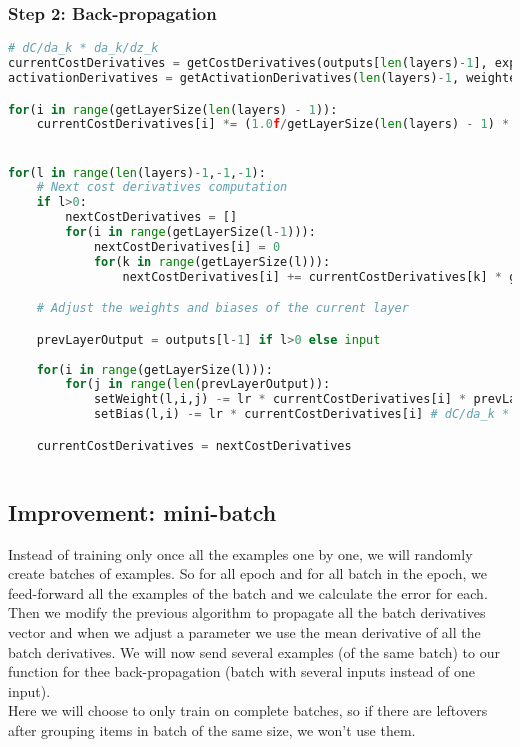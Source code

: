 \documentclass[11pt,a4paper]{report}
\begin{document}
\subsubsection{Step 2: Back-propagation}
\begin{lstlisting}[language=Python]
# dC/da_k * da_k/dz_k
currentCostDerivatives = getCostDerivatives(outputs[len(layers)-1], expectedOutput) # vector of dC/da_k for all k
activationDerivatives = getActivationDerivatives(len(layers)-1, weightedSums[getNbLayers()-1]); # vector of da_k/dz_k for all k

for(i in range(getLayerSize(len(layers) - 1)):
    currentCostDerivatives[i] *= (1.0f/getLayerSize(len(layers) - 1) * activationDerivatives[i];


for(l in range(len(layers)-1,-1,-1):
    # Next cost derivatives computation
    if l>0:
        nextCostDerivatives = []
        for(i in range(getLayerSize(l-1))):
            nextCostDerivatives[i] = 0
            for(k in range(getLayerSize(l))):
                nextCostDerivatives[i] += currentCostDerivatives[k] * getWeight(l,k,i) # dC/da_k * da_k/dz_k * dz_k/da_i

    # Adjust the weights and biases of the current layer

    prevLayerOutput = outputs[l-1] if l>0 else input
    
    for(i in range(getLayerSize(l))):
        for(j in range(len(prevLayerOutput)):
            setWeight(l,i,j) -= lr * currentCostDerivatives[i] * prevLayerOutput[j] # lr = learning rate and we have dC/da_k * da_k/dz_k * dz_k/dw_i,j
            setBias(l,i) -= lr * currentCostDerivatives[i] # dC/da_k * da_k/dz_k

    currentCostDerivatives = nextCostDerivatives
   
\end{lstlisting}

\newpage
\subsection{Improvement: mini-batch}

Instead of training only once all the examples one by one, we will randomly create batches of examples. So for all epoch and for all batch in the epoch, we feed-forward all the examples of the batch and we calculate the error for each. Then we modify the previous algorithm to propagate all the batch derivatives vector and when we adjust a parameter we use the mean derivative of all the batch derivatives.
We will now send several examples (of the same batch) to our function for thee back-propagation (batch with several inputs instead of one input).\\
Here we will choose to only train on complete batches, so if there are leftovers after grouping items in batch of the same size, we won't use them.
\end{document}
